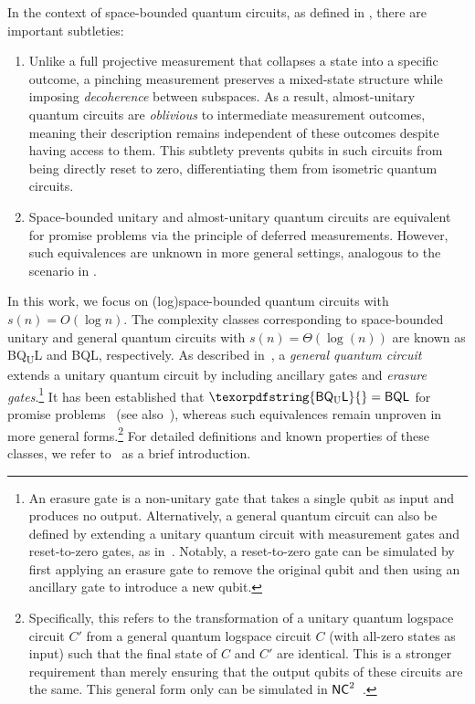 \documentclass[10pt,a4paper]{article}
\numberwithin{equation}{section}
\numberwithin{figure}{section}
\newcommand{\BQL}{\textnormal{\textsf{BQL}}\xspace}
\newcommand{\BQUL}{\texorpdfstring{\textnormal{\textsf{BQ}\textsubscript{U}\textsf{L}}}\xspace}
\newcommand{\NC}{\textnormal{\textsf{NC}}\xspace}
\begin{document}
\begin{remark}
    \label{remark:subtleties-space-bounded-circuits}
    In the context of space-bounded quantum circuits, as defined in , there are important subtleties: 
    \begin{enumerate}[label={\upshape(\arabic*)}, topsep=0.33em, itemsep=0.33em, parsep=0.33em, leftmargin=2em]
        \item Unlike a full projective measurement that collapses a state into a specific outcome, a pinching measurement preserves a mixed-state structure while imposing \textit{decoherence} between subspaces. As a result, almost-unitary quantum circuits are \textit{oblivious} to intermediate measurement outcomes, meaning their description remains independent of these outcomes despite having access to them. This subtlety prevents qubits in such circuits from being directly reset to zero, differentiating them from isometric quantum circuits. 
        \label{remarkitem:pinching-measurement}
        \item Space-bounded unitary and almost-unitary quantum circuits are equivalent for promise problems via the principle of deferred measurements. However, such equivalences are unknown in more general settings, analogous to the scenario in . 
    \end{enumerate}
\end{remark}

In this work, we focus on (log)space-bounded quantum circuits with $s(n) = O(\log{n})$. 
The complexity classes corresponding to space-bounded unitary and general quantum circuits with $s(n) = \Theta(\log(n))$ are known as \BQUL{} and \BQL{}, respectively. 
As described in~\cite[Section 2.3]{VW16}, a \textit{general quantum circuit} extends a unitary quantum circuit by including ancillary gates and \textit{erasure gates}.\footnote{An erasure gate is a non-unitary gate that takes a single qubit as input and produces no output. Alternatively, a general quantum circuit can also be defined by extending a unitary quantum circuit with measurement gates and reset-to-zero gates, as in~\cite{FR21,GR22}. Notably, a reset-to-zero gate can be simulated by first applying an erasure gate to remove the original qubit and then using an ancillary gate to introduce a new qubit.}  
It has been established that $\BQUL{}=\BQL{}$ for promise problems~\cite{FR21} (see also~\cite{GRZ21,GR22}), whereas such equivalences remain unproven in more general forms.\footnote{Specifically, this refers to the transformation of a unitary quantum logspace circuit $C'$ from a general quantum logspace circuit $C$ (with all-zero states as input) such that the final state of $C$ and $C'$ are identical. This is a stronger requirement than merely ensuring that the output qubits of these circuits are the same. This general form only can be simulated in $\NC^2$~\cite{Wat99,Wat03}.\label{footref:BQL-eq-BQUL-strong-forms}}
For detailed definitions and known properties of these classes, we refer to~\cite[Section 2.3]{LGLW23} as a brief introduction. 
\end{document}
